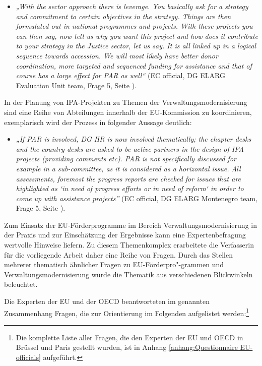 \begin{itemize}[label={}]
\item \textit{„With the sector approach there is leverage. You basically ask for a strategy and commitment to certain objectives in the strategy. Things are then formulated out in national programmes and projects. With these projects you can then say, now tell us why you want this project and how does it contribute to your strategy in the Justice sector, let us say. It is all linked up in a logical sequence towards accession. We will most likely have better donor coordination, more targeted and sequenced funding for assistance and that of course has a large effect for PAR as well“} (EC official, DG ELARG Evaluation Unit team, Frage 5, Seite \pageref{sec:admin}).
\end{itemize}
In der Planung von IPA-Projekten zu Themen der Verwaltungsmodernisierung sind eine Reihe von Abteilungen innerhalb der EU-Kommission zu koordinieren, exemplarisch wird der Prozess in folgender Aussage deutlich:
\begin{itemize}[label={}]
\item \textit{„If PAR is involved, DG HR is now involved thematically; the chapter desks and the country desks are asked to be active partners in the design of IPA projects (providing comments etc). PAR is not specifically discussed for example in a sub-committee, as it is considered as a horizontal issue. All assessments, foremost the progress reports are checked for issues that are highlighted as `in need of progress efforts or in need of reform` in order to come up with assistance projects”} (EC official, DG ELARG Montenegro team, Frage 5, Seite \pageref{sec:admin}).
\end{itemize}
Zum Einsatz der EU-Förderprogramme im Bereich Verwaltungsmodernisierung in der Praxis und zur Einschätzung der Ergebnisse kann eine Expertenbefragung wertvolle Hinweise liefern. Zu diesem Themenkomplex erarbeitete die Verfasserin für die vorliegende Arbeit daher eine Reihe von Fragen. Durch das Stellen mehrerer thematisch ähnlicher Fragen zu EU-Förderpro"-grammen und Verwaltungsmodernisierung wurde die Thematik aus verschiedenen Blickwinkeln beleuchtet.\par
Die Experten der EU und der OECD beantworteten im genannten Zusammenhang Fragen, die zur Orientierung im Folgenden aufgelistet werden:\footnote{Die komplette Liste aller Fragen, die den Experten der EU und OECD in Brüssel und Paris gestellt wurden, ist in Anhang \ref{anhang:Questionnaire EU-officials} aufgeführt.}
